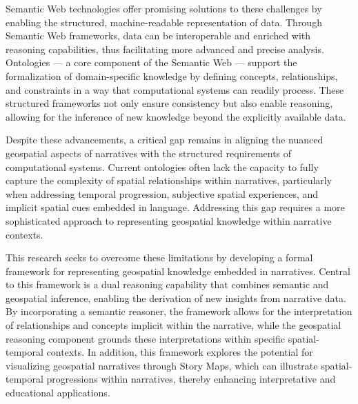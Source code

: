 Semantic Web technologies offer promising solutions to these challenges by enabling the structured, machine-readable representation of data. Through Semantic Web frameworks, data can be interoperable and enriched with reasoning capabilities, thus facilitating more advanced and precise analysis. Ontologies — a core component of the Semantic Web — support the formalization of domain-specific knowledge by defining concepts, relationships, and constraints in a way that computational systems can readily process. These structured frameworks not only ensure consistency but also enable reasoning, allowing for the inference of new knowledge beyond the explicitly available data.

Despite these advancements, a critical gap remains in aligning the nuanced geospatial aspects of narratives with the structured requirements of computational systems. Current ontologies often lack the capacity to fully capture the complexity of spatial relationships within narratives, particularly when addressing temporal progression, subjective spatial experiences, and implicit spatial cues embedded in language. Addressing this gap requires a more sophisticated approach to representing geospatial knowledge within narrative contexts.

This research seeks to overcome these limitations by developing a formal framework for representing geospatial knowledge embedded in narratives. Central to this framework is a dual reasoning capability that combines semantic and geospatial inference, enabling the derivation of new insights from narrative data. By incorporating a semantic reasoner, the framework allows for the interpretation of relationships and concepts implicit within the narrative, while the geospatial reasoning component grounds these interpretations within specific spatial-temporal contexts. In addition, this framework explores the potential for visualizing geospatial narratives through Story Maps, which can illustrate spatial-temporal progressions within narratives, thereby enhancing interpretative and educational applications.

